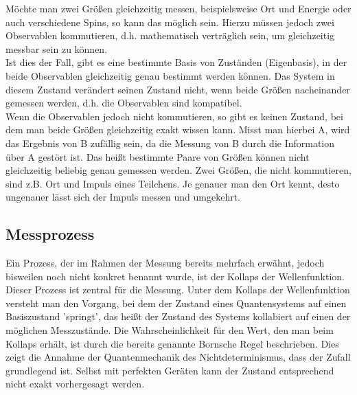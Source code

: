 Möchte man zwei Größen gleichzeitig messen, beispielsweise Ort und Energie oder auch verschiedene Spins, so kann das möglich sein. Hierzu müssen jedoch zwei Observablen kommutieren, d.h. mathematisch verträglich sein, um gleichzeitig messbar sein zu können. \\
Ist dies der Fall, gibt es eine bestimmte Basis von Zuständen (Eigenbasis), in der beide Observablen gleichzeitig genau bestimmt werden können. Das System in diesem Zustand verändert seinen Zustand nicht, wenn beide Größen nacheinander gemessen werden, d.h. die Observablen sind kompatibel. \\
Wenn die Observablen jedoch nicht kommutieren, so gibt es keinen Zustand, bei dem man beide Größen gleichzeitig exakt wissen kann. Misst man hierbei A, wird das Ergebnis von B zufällig sein, da die Messung von B durch die Information über A gestört ist.
Das heißt bestimmte Paare von Größen können nicht gleichzeitig beliebig genau gemessen werden. 
Zwei Größen, die nicht kommutieren, sind z.B. Ort und Impuls eines Teilchens. Je genauer man den Ort kennt, desto ungenauer lässt sich der Impuls messen und umgekehrt. 
\cite{kasirajan_fundamentals_2021}

\subsection{Messprozess}

Ein Prozess, der im Rahmen der Messung bereits mehrfach erwähnt, jedoch bisweilen noch nicht konkret benannt wurde, ist der Kollaps der Wellenfunktion. Dieser Prozess ist zentral für die Messung. 
Unter dem Kollaps der Wellenfunktion versteht man den Vorgang, bei dem der Zustand eines Quantensystems auf einen Basiszustand 'springt', das heißt der Zustand des Systems kollabiert auf einen der möglichen Messzustände. Die Wahrscheinlichkeit für den Wert, den man beim Kollaps erhält, ist durch die bereits genannte Bornsche Regel beschrieben.
Dies zeigt die Annahme der Quantenmechanik des Nichtdeterminismus, dass der Zufall grundlegend ist. Selbst mit perfekten Geräten kann der Zustand entsprechend nicht exakt vorhergesagt werden. 
\cite{lvovsky_quantum_2018}
\\

